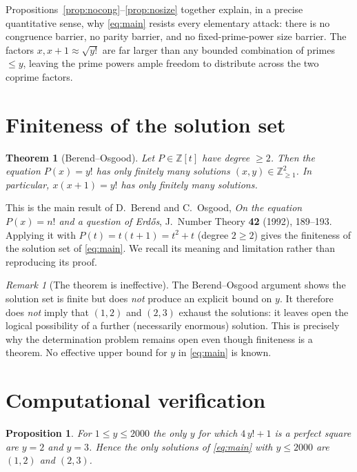 \documentclass{amsart}
\theoremstyle{plain}
\newtheorem{theorem}{Theorem}
\newtheorem{proposition}{Proposition}
\theoremstyle{remark}
\newtheorem{remark}{Remark}
\begin{document}
Propositions~\ref{prop:nocong}--\ref{prop:nosize} together explain, in a
precise quantitative sense, why \eqref{eq:main} resists every elementary
attack: there is no congruence barrier, no parity barrier, and no
fixed-prime-power size barrier. The factors $x,x+1\approx\sqrt{y!}$ are far
larger than any bounded combination of primes $\le y$, leaving the prime
powers ample freedom to distribute across the two coprime factors.

\section{Finiteness of the solution set}\label{sec:finite}

\begin{theorem}[Berend--Osgood]\label{thm:finite}
Let $P\in\mathbb{Z}[t]$ have degree $\ge 2$.  Then the equation $P(x)=y!$
has only finitely many solutions $(x,y)\in\mathbb{Z}_{\ge 1}^2$.  In
particular, $x(x+1)=y!$ has only finitely many solutions.
\end{theorem}

This is the main result of D.~Berend and C.~Osgood, \emph{On the equation
$P(x)=n!$ and a question of Erd\H{o}s}, J.\ Number Theory \textbf{42}
(1992), 189--193.  Applying it with $P(t)=t(t+1)=t^2+t$ (degree $2\ge2$)
gives the finiteness of the solution set of \eqref{eq:main}. We recall its
meaning and limitation rather than reproducing its proof.

\begin{remark}[The theorem is ineffective]\label{rem:ineff}
The Berend--Osgood argument shows the solution set is finite but does
\emph{not} produce an explicit bound on $y$. It therefore does \emph{not}
imply that $(1,2)$ and $(2,3)$ exhaust the solutions: it leaves open the
logical possibility of a further (necessarily enormous) solution. This is
precisely why the determination problem remains open even though finiteness
is a theorem. No effective upper bound for $y$ in \eqref{eq:main} is known.
\end{remark}

\section{Computational verification}\label{sec:comput}

\begin{proposition}\label{prop:comp}
For $1\le y\le 2000$ the only $y$ for which $4\,y!+1$ is a perfect square
are $y=2$ and $y=3$.  Hence the only solutions of \eqref{eq:main} with
$y\le 2000$ are $(1,2)$ and $(2,3)$.
\end{proposition}
\end{document}
